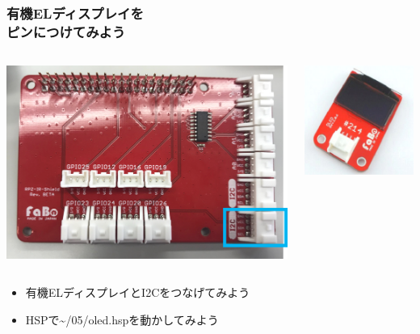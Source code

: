 \begin{frame}[fragile]
    \frametitle{有機ELディスプレイを\\ピンにつけてみよう}
    \begin{columns}
        \begin{column}{0.48\textwidth}
            \includegraphics[width=\textwidth]{images/chap05/text05-img033.png} 
        \end{column}
        \begin{column}{0.48\textwidth}
            \includegraphics[width=\textwidth]{images/chap05/text05-img025.png} 
        \end{column}
    \end{columns}
    \begin{itemize}
        \item 有機ELディスプレイとI2Cをつなげてみよう
        \item HSPで\textasciitilde/05/oled.hspを動かしてみよう
    \end{itemize}
\end{frame}


